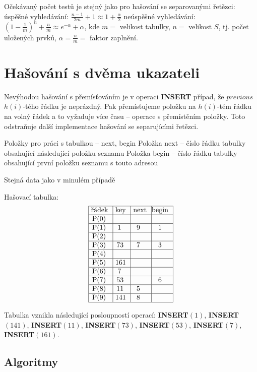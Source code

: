 \documentclass[a4paper,12pt]{article}
\begin{document}
Očekávaný počet testů je stejný jako pro 
hašování se se\-pa\-ro\-va\-ný\-mi řetězci:\newline 
\phantom{---}úspěšné vyhledávání: $\frac {n-1}{
2m}+1\approx 1+\frac {\alpha}2$\newline 
\phantom{---}neúspěšné vyhledávání: $(1-\frac 1
m)^n+\frac nm\approx e^{-\alpha}+\alpha$,\newline 
kde $m=$ velikost tabulky, $n=$ velikost $S$, tj. počet uložených 
prvků, $\alpha =\frac nm=$ faktor zaplnění.

\section{Hašování s dvěma ukazateli}

Nevýhodou hašování s přemísťováním je v operaci 
{\bf INSERT} případ, že $previous$ $h(i)$-tého řádku je neprázdný. Pak přemísťujeme položku na $h(i)$-tém řádku na volný řádek a to vyžaduje více času -- operace s přemístěním 
položky. Toto odstraňuje další implementace hašování se 
separujícími řetězci.

Položky pro práci s tabulkou -- next, 
begin\newline 
\phantom{---}Položka next -- číslo řádku tabulky obsahující 
následující polož\-ku seznamu\newline 
\phantom{---}Položka begin -- číslo řádku tabulky obsahující první položku seznamu 
s touto adresou\newline 

Stejná data jako v minulém případě\newline 

Hašovací tabulka:
$$\vtop{\offinterlineskip\halign {\strut\vrule\ # & \vrule\ # & \vrule\ # & \vrule \hfil # \hfil \vrule\cr\noalign{\hrule}řádek & key & next & begin \hfil \cr\noalign{\hrule}P(0) & & & \hfill \cr\noalign{\hrule}P(1) & 1 & 9 & 1 \cr\noalign{\hrule}P(2) & & & \hfill \cr\noalign{\hrule}P(3) & 73 & 7 & 3 \cr\noalign{\hrule}P(4) & & &\hfill \cr\noalign{\hrule}P(5) & 161 & & \hfill \cr\noalign{\hrule}P(6) & 7 & & \hfill \cr\noalign{\hrule}P(7) & 53 & & 6 \cr\noalign{\hrule}P(8) & 11 & 5 & \hfill \cr\noalign{\hrule}P(9) & 141 & 8 & \hfill \cr\noalign{\hrule}}}$$

Tabulka vznikla následující posloupností 
operací:\newline 
{\bf INSERT$(1)$}, {\bf INSERT$(141)$}, {\bf INSERT$(11)$}, {\bf INSERT$
(73)$}, 
{\bf INSERT$(53)$}, {\bf INSERT$(7)$}, {\bf INSERT$(161)$}. 

\subsection{
Algoritmy
}
\end{document}
